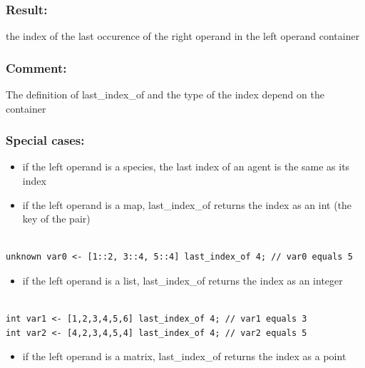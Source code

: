 \documentclass[]{book}
\providecommand{\tightlist}{%
  \setlength{\itemsep}{0pt}\setlength{\parskip}{0pt}}
\theoremstyle{definition}
\theoremstyle{definition}
\theoremstyle{definition}
\theoremstyle{remark}
\begin{document}
\subsubsection{Result:}\label{result-307}

the index of the last occurence of the right operand in the left operand
container

\subsubsection{Comment:}\label{comment-57}

The definition of last\_index\_of and the type of the index depend on
the container

\subsubsection{Special cases:}\label{special-cases-85}

\begin{itemize}
\tightlist
\item
  if the left operand is a species, the last index of an agent is the
  same as its index\\
\item
  if the left operand is a map, last\_index\_of returns the index as an
  int (the key of the pair)
\end{itemize}

\begin{verbatim}
 
unknown var0 <- [1::2, 3::4, 5::4] last_index_of 4; // var0 equals 5
\end{verbatim}

\begin{itemize}
\tightlist
\item
  if the left operand is a list, last\_index\_of returns the index as an
  integer
\end{itemize}

\begin{verbatim}
 
int var1 <- [1,2,3,4,5,6] last_index_of 4; // var1 equals 3 
int var2 <- [4,2,3,4,5,4] last_index_of 4; // var2 equals 5
\end{verbatim}

\begin{itemize}
\tightlist
\item
  if the left operand is a matrix, last\_index\_of returns the index as
  a point
\end{itemize}
\end{document}

